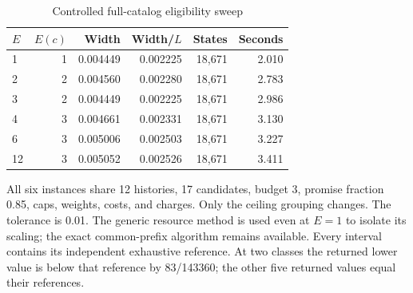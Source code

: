 \begin{table}[p]\centering
\caption{Controlled full-catalog eligibility sweep}\label{tab:sweep52}
\setlength{\tabcolsep}{4pt}
\begin{tabular}{lrrrrr}
\toprule
$E$ & $E(c)$ & Width & Width/$L$ & States & Seconds\\
\midrule
1 & 1 & 0.004449 & 0.002225 & 18,671 & 2.010\\
2 & 2 & 0.004560 & 0.002280 & 18,671 & 2.783\\
3 & 2 & 0.004449 & 0.002225 & 18,671 & 2.986\\
4 & 3 & 0.004661 & 0.002331 & 18,671 & 3.130\\
6 & 3 & 0.005006 & 0.002503 & 18,671 & 3.227\\
12 & 3 & 0.005052 & 0.002526 & 18,671 & 3.411\\
\bottomrule\end{tabular}
\par\vspace{6pt}\begin{minipage}{\textwidth}All six instances share 12 histories, 17 candidates, budget 3, promise fraction 0.85, caps, weights, costs, and charges. Only the ceiling grouping changes. The tolerance is 0.01. The generic resource method is used even at $E=1$ to isolate its scaling; the exact common-prefix algorithm remains available. Every interval contains its independent exhaustive reference. At two classes the returned lower value is below that reference by 83/143360; the other five returned values equal their references.\end{minipage}
\end{table}
